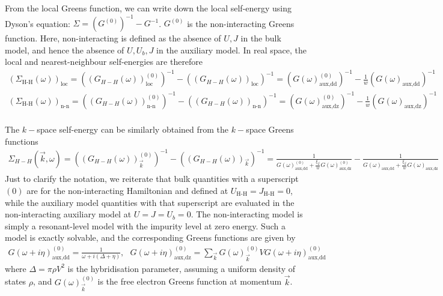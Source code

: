\documentclass{report}
\numberwithin{equation}{section}
\begin{document}
From the local Greens function, we can write down the local self-energy using Dyson's equation: \(\Sigma = \left(G^{(0)}\right)^{-1} - G^{-1}\). \(G^{(0)}\) is the non-interacting Greens function. Here, non-interacting is defined as the absence of \(U,J\) in the bulk model, and hence the absence of \(U,U_b,J\) in the auxiliary model. In real space, the local and nearest-neighbour self-energies are therefore
\begin{equation}\begin{aligned}
	\left(\Sigma_\text{H-H}(\omega)\right)_\text{loc} = \left(\left(G_{H-H}(\omega)\right)_\text{loc}^{(0)}\right)^{-1} - \left(\left(G_{H-H}(\omega)\right)_\text{loc}\right)^{-1} = \left(G(\omega)_\text{aux,dd}^{(0)}\right)^{-1} - \frac{1}{w}\left(G(\omega)_\text{aux,dd}\right)^{-1} \\
	\left(\Sigma_\text{H-H}(\omega)\right)_\text{n-n} = \left(\left(G_{H-H}(\omega)\right)_\text{n-n}^{(0)}\right)^{-1} - \left(\left(G_{H-H}(\omega)\right)_\text{n-n}\right)^{-1} = \left(G(\omega)_\text{aux,dz}^{(0)}\right)^{-1} - \frac{1}{w}\left(G(\omega)_\text{aux,dz}\right)^{-1}\\
\end{aligned}\end{equation}

The \(k-\)space self-energy can be similarly obtained from the \(k-\)space Greens functions
\begin{equation}\begin{aligned}
	\label{self-energy1}
	\Sigma_{H-H}(\vec k,\omega) = \left(\left(G_{H-H}(\omega)\right)_{\vec k}^{(0)}\right)^{-1} - \left(\left(G_{H-H}(\omega)\right)_{\vec k}\right)^{-1} = \frac{1}{G(\omega)_\text{aux,dd}^{(0)} + \frac{\xi_{\vec k}}{w}G(\omega)_\text{aux,dz}^{(0)}} -  \frac{1}{G(\omega)_\text{aux,dd} + \frac{\xi_{\vec k}}{w}G(\omega)_\text{aux,dz}}
\end{aligned}\end{equation}
Just to clarify the notation, we reiterate that bulk quantities with a superscript \((0)\) are for the non-interacting Hamiltonian and defined at \(U_\text{H-H}=J_\text{H-H}=0\), while the auxiliary model quantities with that superscript are evaluated in the non-interacting auxiliary model at \(U=J=U_b=0\). The non-interacting model is simply a resonant-level model with the impurity level at zero energy. Such a model is exactly solvable, and the corresponding Greens functions are given by
\begin{equation}\begin{aligned}
	G(\omega + i\eta)_\text{aux,dd}^{(0)} = \frac{1}{\omega + i\left(\Delta + \eta\right)}, ~ ~ ~ G(\omega + i\eta)_\text{aux,dz}^{(0)} = \sum_{\vec k} G(\omega)^{(0)}_{\vec k} V G(\omega + i\eta)_\text{aux,dd}^{(0)}
\end{aligned}\end{equation}
where \(\Delta = \pi \rho V^2\) is the hybridisation parameter, assuming a uniform density of states \(\rho\), and \(G(\omega)^{(0)}_{\vec k}\) is the free electron Greens function at momentum \(\vec k\).
\end{document}
